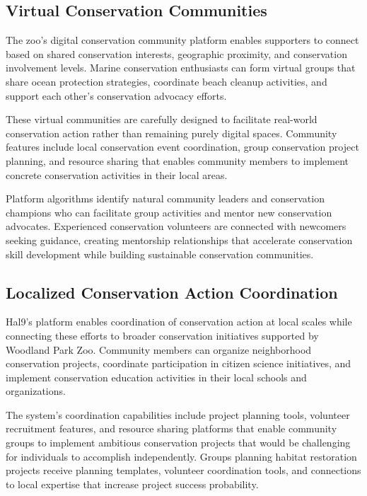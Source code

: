 \documentclass[
  Letterpaper,
]{scrbook}
\begin{document}
\subsection{Virtual Conservation
Communities}\label{virtual-conservation-communities}

The zoo's digital conservation community platform enables supporters to
connect based on shared conservation interests, geographic proximity,
and conservation involvement levels. Marine conservation enthusiasts can
form virtual groups that share ocean protection strategies, coordinate
beach cleanup activities, and support each other's conservation advocacy
efforts.

These virtual communities are carefully designed to facilitate
real-world conservation action rather than remaining purely digital
spaces. Community features include local conservation event
coordination, group conservation project planning, and resource sharing
that enables community members to implement concrete conservation
activities in their local areas.

Platform algorithms identify natural community leaders and conservation
champions who can facilitate group activities and mentor new
conservation advocates. Experienced conservation volunteers are
connected with newcomers seeking guidance, creating mentorship
relationships that accelerate conservation skill development while
building sustainable conservation communities.

\subsection{Localized Conservation Action
Coordination}\label{localized-conservation-action-coordination}

Hal9's platform enables coordination of conservation action at local
scales while connecting these efforts to broader conservation
initiatives supported by Woodland Park Zoo. Community members can
organize neighborhood conservation projects, coordinate participation in
citizen science initiatives, and implement conservation education
activities in their local schools and organizations.

The system's coordination capabilities include project planning tools,
volunteer recruitment features, and resource sharing platforms that
enable community groups to implement ambitious conservation projects
that would be challenging for individuals to accomplish independently.
Groups planning habitat restoration projects receive planning templates,
volunteer coordination tools, and connections to local expertise that
increase project success probability.
\end{document}
